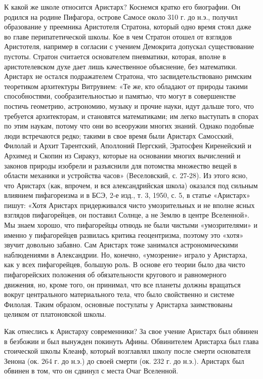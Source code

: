 К какой же школе относится Аристарх? Коснемся кратко его биографии. Он
родился на родине Пифагора, острове Самосе около 310 г. до н.э.,
получил образование у преемника Аристотеля Стратона, который одно
время стоял даже во главе перипатетической школы. Кое в чем Стратон
отошел от взглядов Аристотеля, например в согласии с учением Демокрита
допускал существование пустоты. Стратон считается основателем
пневматики, которая, вполне в аристотелевском духе дает лишь
качественное объяснение, без математики. Аристарх не остался
подражателем Стратона, что засвидетельствовано римским теоретиком
архитектуры Витрувием: «Те же, кто обладают от природы такими
способностями, сообразительностью и памятью, что могут в совершенстве
постичь геометрию, астрономию, музыку и прочие науки, идут дальше
того, что требуется архитекторам, и становятся математиками; им легко
выступать в спорах по этим наукам, потому что они во всеоружии многих
знаний. Однако подобные люди встречаются редко; такими в свое время
были Аристарх Самосский, Филолай и Архит Тарентский, Аполлоний
Пергский, Эратосфен Киренейский и Архимед и Скопин из Сиракуз, которые
на основании многих вычислений и законов природы изобрели и разъяснили
для потомства множество вещей в области механики и устройства часов»
(Веселовский, с. 27-28). Из этого ясно, что Аристарх (как, впрочем, и
вся александрийская школа) оказался под сильным влиянием пифагореизма
и в БСЭ, 2-е изд., т. 3, 1950, с. 5, в статье «Аристарх» пишут: «Хотя
Аристарх придерживался чисто умозрительных и не вполне ясных взглядов
пифагорейцев, он поставил Солнце, а не Землю в центре Вселенной». Мы
знаем хорошо, что пифагорейцы отнюдь не были чистыми «умозрителями» и
именно у пифагорейцев развилась критика геоцентризма, поэтому это
«хотя» звучит довольно забавно. Сам Аристарх тоже занимался
астрономическими наблюдениями в Александрии. Но, конечно, «умозрение»
играло у Аристарха, как у всех пифагорейцев, большую роль. В основе
его теории было два чисто пифагорейских положения об обязательности
кругового и равномерного движения, но, кроме того, он принимал, что
все планеты должны вращаться вокруг центрального материального тела,
что было свойственно и системе Филолая. Таким образом, основные
постулаты у Аристарха заимствованы целиком от платоновской школы.

Как отнеслись к Аристарху современники? За свое учение Аристарх был
обвинен в безбожии и был вынужден покинуть Афины. Обвинителем
Аристарха был глава стоической школы Клеанф, который возглавлял школу
после смерти основателя Зенона (ок. 264 г. до н.э.) до своей смерти
(ок. 232 г. до н.э.). Аристарх был обвинен в том, что он сдвинул с
места Очаг Вселенной.

